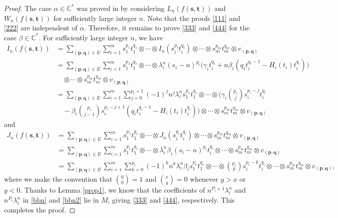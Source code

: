 \documentclass[12pt,leqno,amscd,amsfonts,amssymb]{amsart}
\def\a{\alpha}
\def\b{\beta}
\def\r{\gamma}
\def\C{\mathbb{C}}
\numberwithin{equation}{section}
\begin{document}
\begin{proof}
The case $\a\in\C^*$ was proved in \cite[Lemma 3.2]{CX} by considering $L_n(f(\mathbf{s}, \mathbf{t}))$ and $W_n(f(\mathbf{s}, \mathbf{t}))$ for sufficiently large integer $n$.
Note that the proofs \eqref{111} and \eqref{222} are independent of $\a$.  Therefore, it remains to prove \eqref{333} and \eqref{444} for the case $\b\in\C^*$. For sufficiently large integer $n$, we have
\begin{align}\label{bbn}
I_n(f(\mathbf{s}, \mathbf{t}))&=\sum_{(\mathbf{p}, \mathbf{q})\in E}\sum_{i=1}^ms_1^{p_1}t_1^{q_1}\otimes\cdots \otimes I_n(s_i^{p_{i}}t_i^{q_i})\otimes\cdots\otimes s_m^{p_m}t_m^{q_m}\otimes v_{(\mathbf{p}, \mathbf{q})}\nonumber\\
&=\sum_{(\mathbf{p}, \mathbf{q})\in E}\sum_{i=1}^{m} s_1^{p_1} t_1^{q_1} \otimes \cdots \otimes \lambda_i^n(s_i-n)^{p_i}\big(\r_i t_i^{q_i}+n\b_i(q_it_i^{q_i-1}-H_i(t_i) t_i^{q_i})\big) \nonumber\\
&\quad\otimes \cdots \otimes s_m^{p_m} t_m^{q_m} \otimes v_{(\mathbf{p}, \mathbf{q})} \nonumber\\
&=\sum_{(\mathbf{p}, \mathbf{q}) \in E} \sum_{i=1}^{m} \sum_{j=0}^{p_i+1} (-1)^j n^j\lambda_i^n  s_1^{p_1} t_1^{q_1} \otimes \cdots \otimes \big(\r_i\binom{p_i}{j} s_i^{p_i-j} t_i^{q_i} \nonumber\\
&\quad-\b_i\binom{p_i}{j-1}s_i^{p_i-j+1}(q_it_i^{q_i-1}-H_i(t_i) t_i^{q_i})\big)\otimes \cdots\otimes s_m^{p_m} t_m^{q_m} \otimes v_{(\mathbf{p}, \mathbf{q})} 
\end{align}
and
\begin{align}\label{bbn2}
J_n(f(\mathbf{s}, \mathbf{t}))&=\sum_{(\mathbf{p}, \mathbf{q})\in E}\sum_{i=1}^ms_1^{p_1}t_1^{q_1}\otimes\cdots \otimes J_n(s_i^{p_{i}}t_i^{q_i})\otimes\cdots\otimes s_m^{p_m}t_m^{q_m}\otimes v_{(\mathbf{p}, \mathbf{q})}\nonumber\\
&=\sum_{(\mathbf{p}, \mathbf{q})\in E}\sum_{i=1}^ms_1^{p_1}t_1^{q_1}\otimes\cdots \otimes \lambda_i^n\b_i(s_i-n)^{p_i} t_i^{q_i}\otimes\cdots\otimes s_m^{p_m}t_m^{q_m}\otimes v_{(\mathbf{p}, \mathbf{q})}\nonumber\\
&=\sum_{(\mathbf{p}, \mathbf{q})\in E}\sum_{i=1}^{m}\sum_{k=0}^{p_i}(-1)^k n^k\lambda_i^n\b_i s_1^{p_1} t_1^{q_1}\otimes\cdots\otimes\binom{p_i}{k} s_i^{p_{i}-k} t_i^{q_i}\otimes\cdots\otimes s_m^{p_m}t_m^{q_m}\otimes v_{(\mathbf{p}, \mathbf{q})},
\end{align}
where we make the convention that $\binom{0}{0}=1$ and $\binom{x}{y}=0$ whenever $y>x$ or $y<0$.  Thanks to Lemma \ref{prop1}, we know that the coefficients of $n^{P_i+1}\lambda_i^n $ and $n^{P_i}\lambda_i^n$ in \eqref{bbn} and \eqref{bbn2}  lie in  $M$, giving  \eqref{333} and \eqref{444}, respectively. This completes the proof.

\end{proof}
\end{document}
